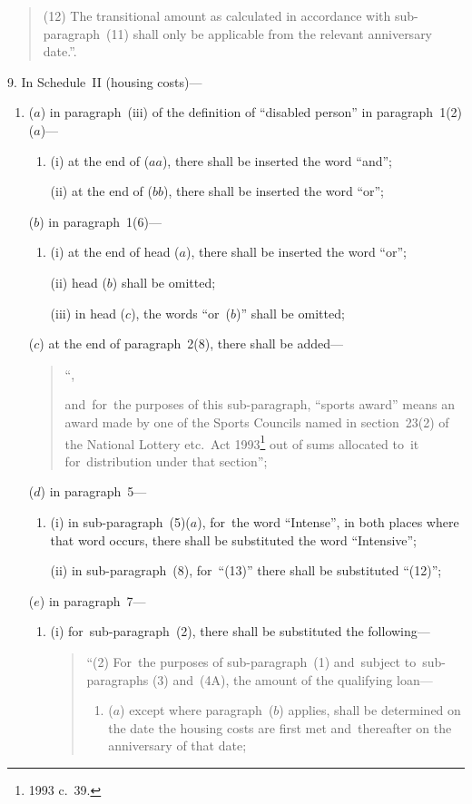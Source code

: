 \documentclass[12pt,a4paper]{article}
\begin{document}
\begin{enumerate}
\begin{enumerate}
\begin{quotation}
(12) The transitional amount as calculated in accordance with sub-paragraph~(11) shall only be applicable from the relevant anniversary date.”.
\end{quotation}
\end{enumerate}
\end{enumerate}

\medskip

9.  In Schedule~II (housing costs)—
\begin{enumerate}\item[]
\begin{sloppypar}
($a$) in paragraph~(iii)  of the definition of “disabled person” in paragraph~1(2)($a$)—
\end{sloppypar}
\begin{enumerate}\item[]
(i) at the end of ($aa$), there shall be inserted the word “and”;

(ii) at the end of ($bb$), there shall be inserted the word “or”;
\end{enumerate}

($b$) in paragraph~1(6)—
\begin{enumerate}\item[]
(i) at the end of head ($a$), there shall be inserted the word “or”;

(ii) head ($b$)  shall be omitted;

(iii) in head ($c$), the words “or~($b$)” shall be omitted;
\end{enumerate}

($c$) at the end of paragraph~2(8), there shall be added—
\begin{quotation}
“,

and~for~the purposes of this sub-paragraph, “sports award” means an award made by one of the Sports Councils named in section~23(2) of the National Lottery etc.\ Act 1993\footnote{1993 c.~39.} out of sums allocated to~it for~distribution under that section”;
\end{quotation}

($d$) in paragraph~5—
\begin{enumerate}\item[]
(i) in sub-paragraph~(5)($a$), for~the word “Intense”, in both places where that word occurs, there shall be substituted the word “Intensive”;

(ii) in sub-paragraph~(8), for~“(13)” there shall be substituted “(12)”;
\end{enumerate}

($e$) in paragraph~7—
\begin{enumerate}\item[]
(i) for~sub-paragraph~(2), there shall be substituted the following—
\begin{quotation}
“(2) For~the purposes of sub-paragraph~(1) and~subject to~sub-paragraphs (3) and~(4A), the amount of the qualifying loan—
\begin{enumerate}\item[]
($a$) except where paragraph~($b$)  applies, shall be determined on the date the housing costs are first met and~thereafter on the anniversary of that date;


\end{enumerate}
\end{quotation}
\end{enumerate}
\end{enumerate}
\end{document}
